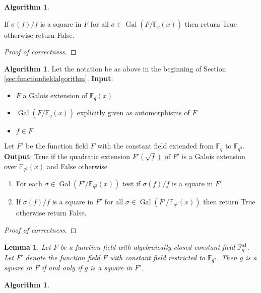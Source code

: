 \documentclass{dcthesis}
\newcommand{\FFqal}{{\mathbb F}_q^{\textup{al}}}
\newcommand{\FF}{\mathbb{F}}
\DeclareMathOperator{\Gal}{Gal}
\numberwithin{equation}{section}
\newtheorem{lemma}[equation]{Lemma}
\theoremstyle{definition}
\newtheorem{alg}[equation]{Algorithm}
\theoremstyle{remark}
\begin{document}
{{\begin{alg}
\begin{enumerate}
          If $\sigma(f)/f$ is a square in $F$
          for all $\sigma\in\Gal(F/\FF_q(x))$
          then return True
          otherwise return False.
      \end{enumerate}
    \end{alg}
    \begin{proof}[Proof of correctness]
    \end{proof}
    \begin{alg}
      \label{alg:isgaloisoverextension}
      Let the notation be
      as above in the beginning of
      Section
      \ref{sec:functionfieldalgorithm}.
      \newline
      \textbf{Input}:
      \begin{itemize}
        \item
          $F$ a Galois extension of
          $\FF_q(x)$
        \item
          $\Gal(F/\FF_q(x))$
          explicitly given
          as automorphisms of $F$
        \item
          $f\in F$
      \end{itemize}
      Let $F'$ be the function field $F$
      with the constant field
      extended
      from $\FF_q$ to $\FF_{q^2}$.
      \textbf{Output}:
      True if the quadratic extension
      $F'(\sqrt{f})$ of $F'$
      is a Galois extension over $\FF_{q^2}(x)$
      and False otherwise
      \begin{enumerate}
        \item
          For each $\sigma\in\Gal(F'/\FF_{q^2}(x))$
          test if $\sigma(f)/f$ is a square
          in $F'$.
        \item
          If $\sigma(f)/f$ is a square in $F'$
          for all $\sigma\in\Gal(F'/\FF_{q^2}(x))$
          then return True
          otherwise return False.
      \end{enumerate}
    \end{alg}
    \begin{proof}[Proof of correctness]
    \end{proof}
    \begin{lemma}
      \label{lem:qsquaredisgoodenough}
      Let $F$ be a function field
      with algebraically closed constant field
      $\FFqal$.
      Let $F'$ denote the function field $F$
      with constant field restricted to
      $\FF_{q^2}$.
      Then $g$ is a square in $F$ if and only if
      $g$ is a square in $F'$.
    \end{lemma}
    \begin{alg}

\end{alg}}}
\end{document}
